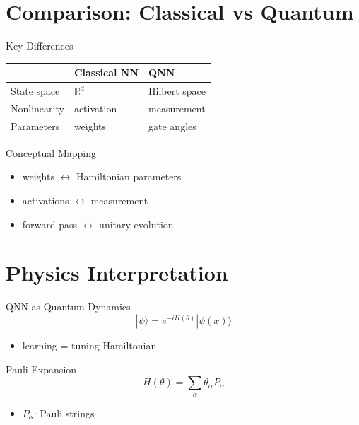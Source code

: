 \documentclass{beamer}
\begin{document}
\section{Comparison: Classical vs Quantum}

\begin{frame}{Key Differences}
\begin{tabular}{l|l|l}
 & Classical NN & QNN \\
\hline
State space & $\mathbb{R}^d$ & Hilbert space \\
Nonlinearity & activation & measurement \\
Parameters & weights & gate angles \\
\end{tabular}
\end{frame}


\begin{frame}{Conceptual Mapping}
\begin{itemize}
\item weights $\leftrightarrow$ Hamiltonian parameters
\item activations $\leftrightarrow$ measurement
\item forward pass $\leftrightarrow$ unitary evolution
\end{itemize}
\end{frame}

\section{Physics Interpretation}

\begin{frame}{QNN as Quantum Dynamics}
\[
|\psi\rangle = e^{-iH(\theta)}|\psi(x)\rangle
\]

\begin{itemize}
\item learning = tuning Hamiltonian
\end{itemize}
\end{frame}


\begin{frame}{Pauli Expansion}
\[
H(\theta) = \sum_\alpha \theta_\alpha P_\alpha
\]

\begin{itemize}
\item $P_\alpha$: Pauli strings
\end{itemize}
\end{frame}
\end{document}
